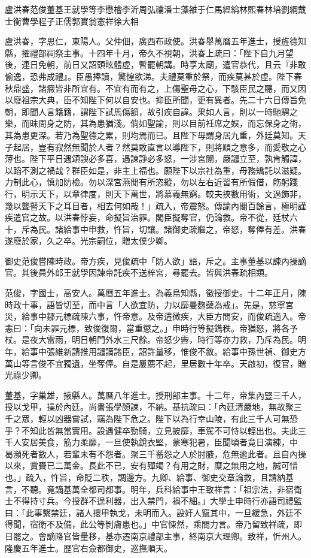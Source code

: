 
\begin{pinyinscope}
盧洪春范俊董基王就學等李懋檜李沂周弘禴潘士藻雒于仁馬經綸林熙春林培劉綱戴士衡曹學程子正儒郭實翁憲祥徐大相

盧洪春，字思仁，東陽人。父仲佃，廣西布政使。洪春舉萬曆五年進士，授旌德知縣，擢禮部祠祭主事。十四年十月，帝久不視朝，洪春上疏曰：「陛下自九月望後，連日免朝，前日又詔頭眩體虛，暫罷朝講。時享太廟，遣官恭代，且云『非敢偷逸，恐弗成禮』。臣愚捧讀，驚惶欲涕。夫禮莫重於祭，而疾莫甚於虛。陛下春秋鼎盛，諸癥皆非所宜有。不宜有而有之，上傷聖母之心，下駭臣民之聽，而又因以廢祖宗大典，臣不知陛下何以自安也。抑臣所聞，更有異者。先二十六日傳旨免朝，即聞人言籍籍，謂陛下試馬傷額，故引疾自諱。果如人言，則以一時馳騁之樂，而昧周身之防，其為患猶淺。倘如聖諭，則以目前衽席之娛，而忘保身之術，其為患更深。若乃為聖德之累，則均焉而已。且陛下毋謂身居九重，外廷莫知。天子起居，豈有寂然無聞於人者？然莫敢直言以導陛下，則將順之意多，而愛敬之心薄也。陛下平日遇頌諛必多喜，遇諫諍必多怒，一涉宮闈，嚴譴立至，孰肯觸諱，以蹈不測之禍哉？群臣如是，非主上福也。願陛下以宗社為重，毋務矯託以滋疑。力制此心，慎加防檢。勿以深宮燕閒有所恣縱，勿以左右近習有所假借，飭躬踐行，明示天下，以章律度，則天下萬世，將慕義無窮。較夫挾數用術，文過飾非，幾以聾瞽天下之耳目者，相去何如哉！」疏入，帝震怒。傳諭內閣百餘言，極明謹疾遣官之故。以洪春悖妄，命擬旨治罪。閣臣擬奪官，仍論救。帝不從，廷杖六十，斥為民。諸給事中申救，忤旨，切讓。諸御史疏繼之，帝怒，奪俸有差。洪春遂廢於家，久之卒。光宗嗣位，贈太僕少卿。

御史范俊嘗陳時政。帝方疾，見俊疏中「防人欲」語，斥之。主事董基以諫內操謫官。其後員外郎王就學因諫帝託疾不送梓宮，尋罷去。皆與洪春疏相類。

范俊，字國士，高安人。萬曆五年進士。為義烏知縣，徵授御史。十二年正月，陳時政十事，語皆切至，而中言「人欲宜防，力以靡曼麴蘗為戒」。先是，慈寧宮災，給事中鄒元標疏陳六事，忤帝意。及帝遘微疾，大臣方問安，而俊疏適入。帝恚曰：「向未罪元標，致俊復爾，當重懲之。」申時行等擬鐫秩。帝猶怒，將各予杖。是夜大雷雨，明日朝門外水三尺餘。帝怒少霽，時行等亦力救，乃斥為民。明年，給事中張維新請推用譴謫諸臣，詔許量移，惟俊不敘。給事中孫世禎、御史方萬山等言俊不宜獨遺，坐奪俸。自是屢薦不起，里居數十年卒。天啟初，復官，贈光祿少卿。

董基，字巢雄，掖縣人。萬曆八年進士。授刑部主事。十二年，帝集內豎三千人，授以戈甲，操於內廷。尚書張學顏諫，不納。基抗疏曰：「內廷清嚴地，無故聚三千之眾，輕以凶器嘗試，竊為陛下危之。陛下以為行幸山陵，有此三千人可無恐乎？不知此皆無當實用。設遇健卒勁騎，立見披靡，車駕不可恃以輕出也。夫此三千人安居美食，筋力柔靡，一旦使執銳衣堅，蒙寒犯暑，臣聞頃者竟日演練，中曷瀕死者數人，若輩未有不怨者。聚三千蓄怨之人於肘腋，危無逾此者。且自內操以來，賞賚已二萬金。長此不已，安有殫竭？有用之財，糜之無用之地，誠可惜也。」疏入，忤旨，命貶二秩，調邊方。九卿、給事、御史交章論救，且請納基言，不聽。竟謫基萬全都司都事。明年，兵科給事中王致祥言：「祖宗法，非宿衛士不得持寸兵。今授群不逞利器，出入禁門，禍不細。」大學士申時行亦語司禮監曰：「此事繫禁廷，諸人擐甲執戈，未明而入。設奸人竄其中，一旦緩急，外廷不得聞，宿衛不及備，此公等剝膚患也。」中官悚然，乘間力言。帝乃留致祥疏，即日罷之。會謫降官皆量移，基亦遷南京禮部主事，終南京大理卿。致祥，忻州人。隆慶五年進士。歷官右僉都御史，巡撫順天。


\end{pinyinscope}
